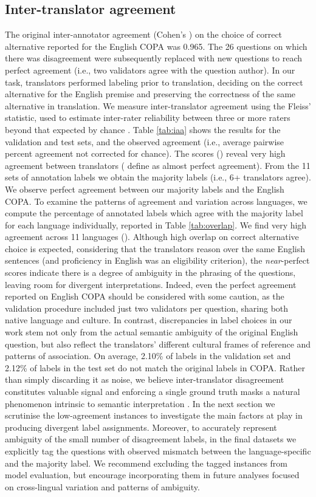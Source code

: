 \documentclass[11pt,a4paper]{article}
\begin{document}
\subsection{Inter-translator agreement}
The original inter-annotator agreement (Cohen's ) on the choice of correct alternative reported for the English COPA \cite{Roemmele:2011aaai} was 0.965. The 26 questions on which there was disagreement were subsequently replaced with new questions to reach perfect agreement (i.e., two validators agree with the question author). In our task, translators performed labeling prior to translation, deciding on the correct alternative for the English premise and preserving the correctness of the same alternative in translation. We measure inter-translator agreement using the Fleiss'  statistic, used to estimate inter-rater reliability between three or more raters beyond that expected by chance \cite{fleiss1971measuring}. Table \ref{tab:iaa} shows the results for the validation and test sets, and the observed agreement (i.e., average pairwise percent agreement not corrected for chance). The scores () reveal very high agreement between translators (\citet{landis1977measurement} define  as almost perfect agreement). From the 11 sets of annotation labels we obtain the majority labels (i.e., 6+ translators agree). We observe perfect agreement between our majority labels and the English COPA. To examine the patterns of agreement and variation across languages, we compute the percentage of annotated labels which agree with the majority label for each language individually, reported in Table \ref{tab:overlap}. We find very high agreement across 11 languages (). Although high overlap on correct alternative choice is expected, considering that the translators reason over the same English sentences (and proficiency in English was an eligibility criterion), the \emph{near}-perfect scores indicate there is a degree of ambiguity in the phrasing of the questions, leaving room for divergent interpretations. Indeed, even the perfect agreement reported on English COPA should be considered with some caution, as the validation procedure included just two validators per question, sharing both native language and culture. In contrast, discrepancies in label choices in our work stem not only from the actual semantic ambiguity of the original English question, but also reflect the translators' different cultural frames of reference and patterns of association. On average, 2.10\% of labels in the validation set and 2.12\% of labels in the test set do not match the original labels in COPA. Rather than simply discarding it as noise, we believe inter-translator disagreement constitutes valuable signal and enforcing a single ground truth masks a natural phenomenon intrinsic to semantic interpretation \cite{aroyo2015truth}. In the next section we scrutinise the low-agreement instances to investigate the main factors at play in producing divergent label assignments. Moreover, to accurately represent ambiguity of the small number of disagreement labels, in the final datasets we explicitly tag the questions with observed mismatch between the language-specific and the majority label. We recommend excluding the tagged instances from model evaluation, but encourage incorporating them in future analyses focused on cross-lingual variation and patterns of ambiguity.
\end{document}
